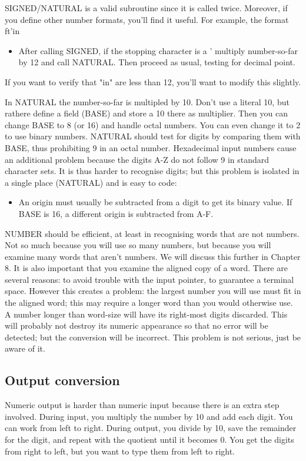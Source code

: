 \documentclass[b5paper, oneside]{book}
\begin{document}
SIGNED/NATURAL is a valid subroutine since it is called twice. Moreover, if you define other number formats, you'll find it useful. For example, the format ft'in\begin{itemize}
   \item After calling SIGNED, if the stopping character is a ' multiply number-so-far by 12 and call NATURAL. Then proceed as usual, testing for decimal point.\end{itemize}
If you want to verify that "in" are less than 12, you'll want to modify this slightly.

In NATURAL the number-so-far is multipled by 10. Don't use a literal 10, but rathere define a field (BASE) and store a 10 there as multiplier. Then you can change BASE to 8 (or 16) and handle octal numbers. You can even change it to 2 to use binary numbers. NATURAL should test for digits by comparing them with BASE, thus prohibiting 9 in an octal number. Hexadecimal input numbers cause an additional problem because the digits A-Z do not follow 9 in standard character sets. It is thus harder to recognise digits; but this problem is isolated in a single place (NATURAL) and is easy to code:\begin{itemize}
   \item An origin must usually be subtracted from a digit to get its binary value. If BASE is 16, a different origin is subtracted from A-F.\end{itemize}

NUMBER should be efficient, at least in recognising words that are not numbers. Not so much because you will use so many numbers, but because you will examine many words that aren't numbers. We will discuss this further in Chapter 8. It is also important that you examine the aligned copy of a word. There are several reasons: to avoid trouble with the input pointer, to guarantee a terminal space. However this creates a problem: the largest number you will use must fit in the aligned word; this may require a longer word than you would otherwise use. A number longer than word-size will have its right-most digits discarded. This will probably not destroy its numeric appearance so that no error will be detected; but the conversion will be incorrect. This problem is not serious, just be aware of it.

\subsection{Output conversion}
Numeric output is harder than numeric input because there is an extra step involved. During input, you multiply the number by 10 and add each digit. You can work from left to right. During output, you divide by 10, save the remainder for the digit, and repeat with the quotient until it becomes 0. You get the digits from right to left, but you want to type them from left to right.
\end{document}
